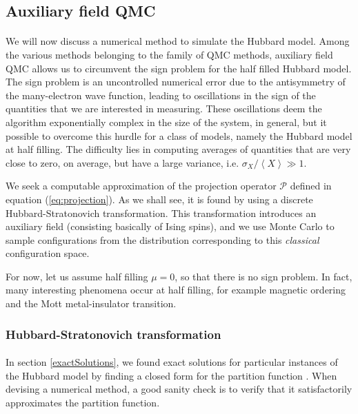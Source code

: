 \documentclass[10pt, twocolumn, twoside]{article}
\begin{document}
\subsection{Auxiliary field QMC}\paragraph{}

We will now discuss a numerical method to simulate the Hubbard model. Among the various methods belonging to the family of QMC methods, auxiliary field QMC allows us to circumvent the sign problem for the half filled Hubbard model. The sign problem is an uncontrolled numerical error due to the antisymmetry of the many-electron wave function, leading to oscillations in the sign of the quantities that we are interested in measuring. These oscillations deem the algorithm exponentially complex in the size of the system, in general, but it possible to overcome this hurdle for a class of models, namely the Hubbard model at half filling. The difficulty lies in computing averages of quantities that are very close to zero, on average, but have a large variance, i.e. $\sigma_X / \left\langle X \right\rangle \gg 1$.

We seek a computable approximation of the projection operator $\mathcal{P}$ defined in equation (\ref{eq:projection}). As we shall see, it is found by using a discrete Hubbard-Stratonovich transformation. This transformation introduces an auxiliary field (consisting basically of Ising spins), and we use Monte Carlo to sample configurations from the distribution corresponding to this \emph{classical} configuration space.

For now, let us assume half filling $\mu = 0$, so that there is no sign problem. In fact, many interesting phenomena occur at half filling, for example magnetic ordering and the Mott metal-insulator transition.

\subsubsection{Hubbard-Stratonovich transformation}\paragraph{}

In section \ref{exactSolutions}, we found exact solutions for particular instances of the Hubbard model by finding a closed form for the partition function \cite{Bai2006}. When devising a numerical method, a good sanity check is to verify that it satisfactorily approximates the partition function.
\end{document}
